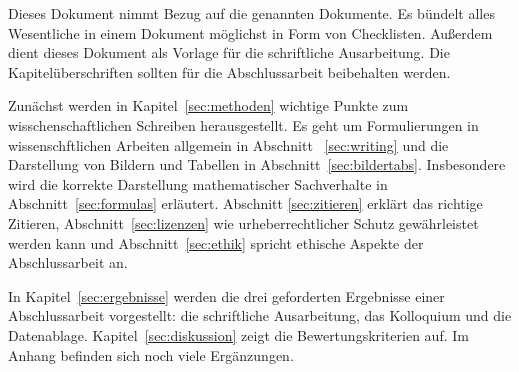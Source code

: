 Dieses Dokument nimmt Bezug auf die genannten Dokumente. Es bündelt alles Wesentliche in einem Dokument möglichst in Form von Checklisten. Außerdem dient dieses Dokument als Vorlage für die schriftliche Ausarbeitung.
Die Kapitelüberschriften sollten für die Abschlussarbeit beibehalten werden.

Zunächst werden in  Kapitel~\ref{sec:methoden}  wichtige Punkte zum wisschenschaftlichen Schreiben herausgestellt. Es geht um Formulierungen in wissenschftlichen Arbeiten allgemein in Abschnitt~ \ref{sec:writing} und die Darstellung von Bildern und Tabellen in Abschnitt~\ref{sec:bildertabs}. Insbesondere wird die korrekte Darstellung mathematischer Sachverhalte in Abschnitt~\ref{sec:formulas} erläutert. Abschnitt \ref{sec:zitieren} erklärt das richtige Zitieren, Abschnitt~\ref{sec:lizenzen} wie urheberrechtlicher Schutz gewährleistet werden kann und Abschnitt~\ref{sec:ethik} spricht ethische Aspekte der Abschlussarbeit an.


In Kapitel~\ref{sec:ergebnisse} werden die drei geforderten Ergebnisse einer Abschlussarbeit vorgestellt: die schriftliche Ausarbeitung, das Kolloquium und die Datenablage.
Kapitel~\ref{sec:diskussion} zeigt die Bewertungskriterien auf.
Im Anhang befinden sich noch viele Ergänzungen. 















